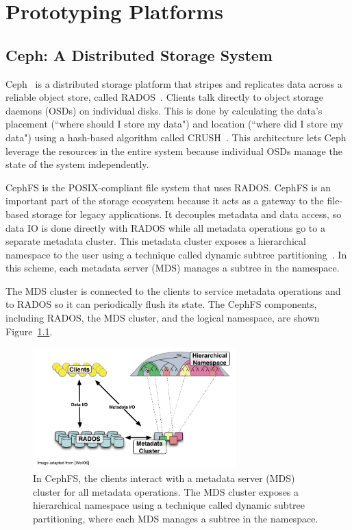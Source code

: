 \chapter{Prototyping Platforms}
\label{chp:prototyping-platform}

\section{Ceph: A Distributed Storage System} Ceph~\cite{weil:osdi2006-ceph} is
a distributed storage platform that stripes and replicates data across a
reliable object store, called RADOS~\cite{weil_rados_2007}. Clients talk
directly to object storage daemons (OSDs) on individual disks. This is done by
calculating the data's placement (``where should I store my data") and location
(``where did I store my data") using a hash-based algorithm called
CRUSH~\cite{weil_crush_2006}. This architecture lets Ceph leverage the
resources in the entire system because individual OSDs manage the state of the
system independently.

CephFS is the POSIX-compliant file system that uses RADOS. CephFS is an
important part of the storage ecosystem because it acts as a gateway to the
file-based storage for legacy applications. It decouples metadata and data
access, so data IO is done directly with RADOS while all metadata operations go
to a separate metadata cluster. This metadata cluster exposes a hierarchical
namespace to the user using a technique called dynamic subtree
partitioning~\cite{weil:sc2004-dyn-metadata}. In this scheme, each metadata
server (MDS) manages a subtree in the namespace. 

The MDS cluster is connected to the clients to service metadata operations and
to RADOS so it can periodically flush its state. The CephFS components,
including RADOS, the MDS cluster, and the logical namespace, are shown
Figure~\ref{ceph-arch}. 

\begin{figure}[t]
\centering
	\includegraphics[width=0.7\textwidth]{./chapters/advancement/figures/ceph-arch.png} 

	\caption{In CephFS, the clients interact with a metadata server (MDS)
        cluster for all metadata operations. The MDS cluster exposes a hierarchical
        namespace using a technique called dynamic subtree partitioning, where each MDS
        manages a subtree in the namespace.\label{ceph-arch}}

\end{figure}

